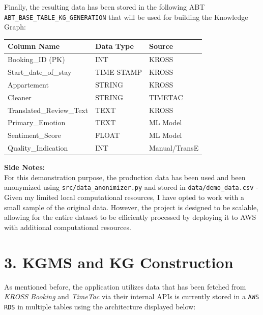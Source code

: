 \documentclass[
]{article}
\begin{document}
Finally, the resulting data has been stored in the following ABT
\texttt{ABT\_BASE\_TABLE\_KG\_GENERATION} that will be used for building
the Knowledge Graph:

\begin{longtable}[]{@{}
  >{\raggedright\arraybackslash}p{}
  >{\raggedright\arraybackslash}p{}
  >{\raggedright\arraybackslash}p{}@{}}\toprule\noalign{}
Column Name & Data Type & Source \\
\midrule\noalign{}
\endhead
\bottomrule\noalign{}
\endlastfoot
Booking\_ID (PK) & INT & KROSS \\
Start\_date\_of\_stay & TIME STAMP & KROSS \\
Appartement & STRING & KROSS \\
Cleaner & STRING & TIMETAC \\
Translated\_Review\_Text & TEXT & KROSS \\
Primary\_Emotion & TEXT & ML Model \\
Sentiment\_Score & FLOAT & ML Model \\
Quality\_Indication & INT & Manual/TransE \\
\end{longtable}

\textbf{Side Notes:} \\
For this demonstration purpose, the production
data has been used and been anonymized using
\texttt{src/data\_anonimizer.py} and stored in
\texttt{data/demo\_data.csv} - Given my limited local computational
resources, I have opted to work with a small sample of the original
data. However, the project is designed to be scalable, allowing for the
entire dataset to be efficiently processed by deploying it to AWS with
additional computational resources.

\pagebreak

\section{3. KGMS and KG Construction}\label{kgms-and-kg-construction}
As mentioned before, the application utilizes data that has been fetched
from \emph{KROSS Booking} and \emph{TimeTac} via their internal APIs is
currently stored in a \texttt{AWS RDS} in multiple tables using the architecture
displayed below:
\end{document}

